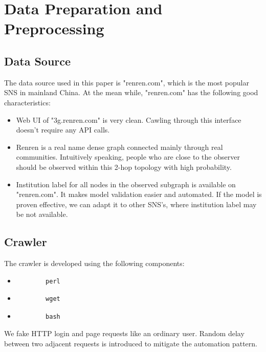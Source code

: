 \documentclass[11pt,a4paper]{article}
\begin{document}
\section{Data Preparation and Preprocessing}

\subsection{Data Source}

The data source used in this paper is "renren.com", which is the 
most popular SNS in mainland China. At the mean while, "renren.com" 
has the following good characteristics:
\begin{itemize}
	\item Web UI of "3g.renren.com" is very clean. Cawling through
	this interface doesn't require any API calls.  
	\item Renren is a real name dense graph connected mainly through 
	real communities. Intuitively speaking, 
	people who are close to the observer should be observed within 
	this 2-hop topology with high probability. 
	\item Institution label for all nodes in the observed subgraph
	is available on "renren.com". It makes model validation easier
	and automated. If the model is proven effective, we can adapt 
	it to other SNS's, where institution label may be not available.  
\end{itemize}

\subsection{Crawler}

The crawler is developed using the following components:
\begin{itemize}
	\item \begin{verbatim}
		perl
	\end{verbatim}
	\item \begin{verbatim}
		wget
	\end{verbatim}
	\item \begin{verbatim}
		bash
	\end{verbatim}
\end{itemize}

We fake HTTP login and page requests like an ordinary user. 
Random delay between two adjacent requests is introduced 
to mitigate the automation pattern. 
\end{document}
